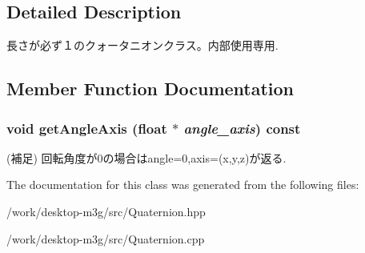 \subsection{Detailed Description}
長さが必ず１のクォータニオンクラス。内部使用専用. 

\subsection{Member Function Documentation}
\hypertarget{classm3g_1_1Quaternion_3049675269aef6bb333d8f83fdf6eed7}{
\subsubsection[{getAngleAxis}]{\setlength{\rightskip}{0pt plus 5cm}void getAngleAxis (float $\ast$ {\em angle\_\-axis}) const}}
\label{classm3g_1_1Quaternion_3049675269aef6bb333d8f83fdf6eed7}


(補足) 回転角度が0の場合はangle=0,axis=(x,y,z)が返る. 

The documentation for this class was generated from the following files:\begin{CompactItemize}
\item 
/work/desktop-m3g/src/Quaternion.hpp\item 
/work/desktop-m3g/src/Quaternion.cpp\end{CompactItemize}
